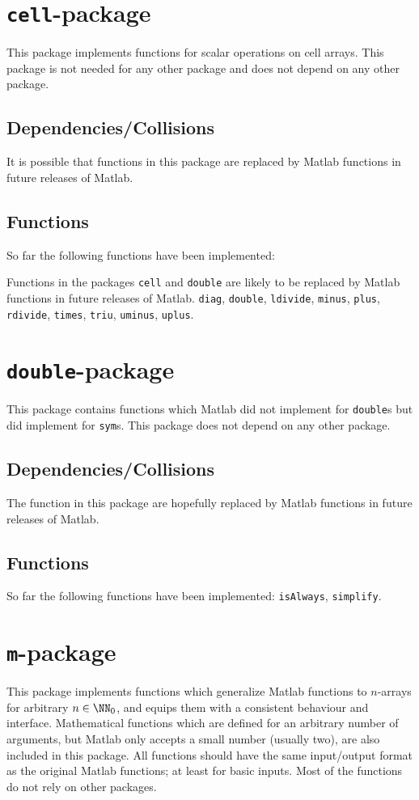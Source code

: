 \section{\texttt{cell}-package}
This package implements functions for scalar operations on cell arrays. 
This package is not needed for any other package and does not depend on any other package.
\subsection*{Dependencies/Collisions}
It is possible that functions in this package are replaced by Matlab functions in future releases of Matlab.

\subsection*{Functions}
So far the following functions have been implemented:

Functions in the packages \texttt{cell} and \texttt{double} are likely to be replaced by Matlab functions in future releases of Matlab.
\texttt{diag},
\texttt{double},
\texttt{ldivide},
\texttt{minus},
\texttt{plus},
\texttt{rdivide},
\texttt{times},
\texttt{triu},
\texttt{uminus},
\texttt{uplus}.

\section{\texttt{double}-package}
This package contains functions which Matlab did not implement for \texttt{double}s but did implement for \texttt{sym}s.
This package does not depend on any other package.

\subsection*{Dependencies/Collisions}
The function in this package are hopefully replaced by Matlab functions in future releases of Matlab.

\subsection*{Functions}
So far the following functions have been implemented:
\texttt{isAlways},
\texttt{simplify}.

\section{\texttt{m}-package}
This package implements functions which generalize Matlab functions to $n$-arrays for arbitrary $n\in\NN_0$, 
and equips them with a consistent behaviour and interface.
Mathematical functions which are defined for an arbitrary number of arguments, 
but Matlab only accepts a small number (usually two), are also included in this package.
All functions should have the same input/output format as the original Matlab functions;
at least for basic inputs. Most of the functions do not rely on other packages. 

